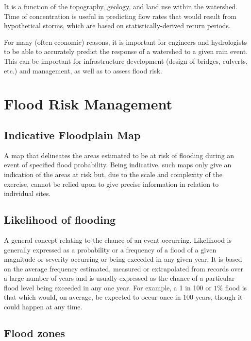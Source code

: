 \documentclass[12pt, a4paper]{article}
\theoremstyle{plain}
\theoremstyle{definition}
\theoremstyle{remark}
\begin{document}
It is a function of the topography, geology, and land use within the watershed. Time of concentration is useful in predicting flow
rates that would result from hypothetical storms, which are based on statistically-derived return periods.

For many (often economic) reasons, it is important for engineers and hydrologists to be able to accurately predict the response of a watershed to a given rain event. This can be important for
infrastructure development (design of bridges, culverts, etc.) and management, as well as to assess flood risk.

\section{Flood Risk Management}
\subsection{Indicative Floodplain Map}

A map that delineates the areas estimated to be at risk of flooding during an event of specified flood
probability. Being indicative, such maps only give an indication of the areas at risk but, due to the scale and
complexity of the exercise, cannot be relied upon to give precise information in relation to individual sites.

\subsection{ Likelihood of flooding}
A general concept relating to the chance of an event occurring. Likelihood is generally expressed as a probability or a frequency of a flood of a given
magnitude or severity occurring or being exceeded in any given year. It is based on the average frequency estimated, measured or extrapolated from records over a large number of years and is usually expressed as the chance of a particular flood level being exceeded
in any one year. For example, a 1 in 100 or $1\%$ flood is that which would, on average, be expected to occur
once in 100 years, though it could happen at any time.

\subsection{ Flood zones}
\end{document}
